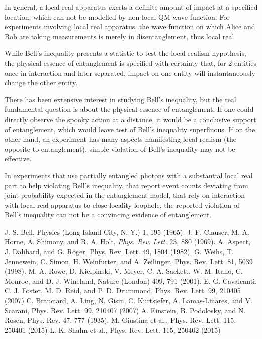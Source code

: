 \documentclass[prd,showpacs,twocolumn]{revtex4-1}
\begin{document}
In general, a local real apparatus exerts a definite amount of impact at a specified location, which can not be modelled by non-local QM wave function. For experiments involving local real apparatus, the wave function on which Alice and Bob are taking measurements is merely in disentanglement, thus local real.

While Bell's inequality presents a statistic to test the local realism hypothesis, the physical essence of entanglement is specified with certainty that, for 2 entities once in interaction and later separated, impact on one entity will instantaneously change the other entity. 

There has been extensive interest in studying Bell's inequality, but the real fundamental question is about the physical essence of entanglement. If one could directly observe the spooky action at a distance, it would be a conclusive support of entanglement, which would leave test of Bell's inequality superfluous. If on the other hand, an experiment has many aspects manifesting local realism (the opposite to entanglement), simple violation of Bell's inequality may not be effective.

In experiments that use partially entangled photons with a substantial local real part to help violating Bell's inequality, that report event counts deviating from joint probability expected in the entanglement model, that rely on interaction with local real apparatus to close locality loophole, the reported violation of Bell's inequality can not be a convincing evidence of entanglement.

\acknowledgments

\begin{thebibliography}{0}

 J. S. Bell, Physics (Long Island City, N. Y.) 1, 195 (1965).
 J. F. Clauser, M. A. Horne, A. Shimony, and R. A. Holt, \emph{Phys. Rev. Lett.} 23, 880 (1969).
 A. Aspect, J. Dalibard, and G. Roger, Phys. Rev. Lett. 49, 1804 (1982).
 G. Weihs, T. Jennewein, C. Simon, H. Weinfurter, and A. Zeilinger, Phys. Rev. Lett. 81, 5039 (1998).
 M. A. Rowe, D. Kielpinski, V. Meyer, C. A. Sackett, W. M. Itano, C. Monroe, and D. J. Wineland, Nature (London) 409, 791 (2001).
 E. G. Cavalcanti, C. J. Foster, M. D. Reid, and P. D. Drummond, Phys. Rev. Lett. 99, 210405 (2007)
 C. Branciard, A. Ling, N. Gisin, C. Kurtsiefer, A. Lamas-Linares, and V. Scarani, Phys. Rev. Lett. 99, 210407 (2007)
 A. Einstein, B. Podolosky, and N. Rosen, Phys. Rev. 47, 777 (1935).
 M. Giustina et al., Phys. Rev. Lett. 115, 250401 (2015)
 L. K. Shalm et al., Phys. Rev. Lett. 115, 250402 (2015)
\end{thebibliography}
\end{document}

